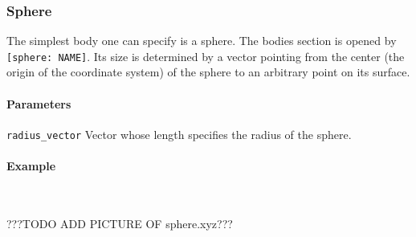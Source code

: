 \subsubsection{Sphere}
The simplest body one can specify is a sphere. The bodies section is opened by \lstinline{[sphere: NAME]}. Its size is determined by a  vector pointing from the center (the origin of the coordinate system) of the sphere to an arbitrary point on its surface.

\paragraph{Parameters}
\begin{description}
 \item{\lstinline{radius_vector}} Vector whose length specifies the radius of the sphere.
\end{description}

\paragraph{Example}\ 


???TODO ADD PICTURE OF sphere.xyz???